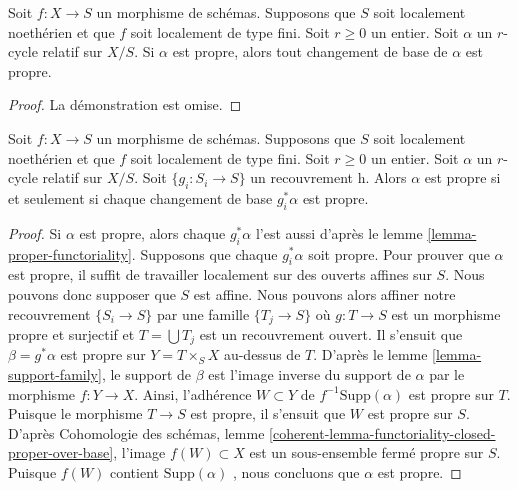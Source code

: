 \begin{lemma} 
\label{lemma-proper-functoriality} 
Soit  $f : X \to S$  un morphisme de schémas. Supposons que  $S$  soit localement noethérien et
 que  $f$  soit localement de type fini. Soit $r \geq 0$  un entier. Soit  
$\alpha$  un  $r$-cycle relatif sur $X/S$. Si  $\alpha$  est propre, 
alors tout changement de base de $\alpha$  est propre. 
\end{lemma} 

\begin{proof} La 
démonstration est omise. 
\end{proof} 

\begin{lemma} 
\label{lemma-proper-h-descent} 
Soit  $f : X \to S$  un morphisme de schémas. Supposons que  $S$  soit localement noethérien et
 que  $f$  soit localement de type fini. Soit $r \geq 0$  un entier. Soit  $\alpha$
  un  $r$-cycle relatif sur $X/S$. Soit  $\{g_i : S_i \to S\}$
  un recouvrement h. Alors  $\alpha$  est propre 
si et seulement si chaque changement de base  $g_i^*\alpha$  est propre. 
\end{lemma} 

\begin{proof} 
Si  $\alpha$  est propre, alors chaque  $g_i^*\alpha$  l'est aussi d'après
 le lemme \ref{lemma-proper-functoriality}. Supposons que chaque  $g_i^*\alpha$
  soit propre. Pour prouver que $\alpha$  est propre, il suffit de travailler 
localement sur des ouverts affines sur  $S$. Nous pouvons donc supposer que  $S$
  est affine. Nous pouvons alors affiner notre recouvrement  $\{S_i \to S\}$
  par une famille $\{T_j \to S\}$  où  $g : T \to S$  est un morphisme propre 
et surjectif et  $T = \bigcup T_j$ est un recouvrement ouvert.
 Il s'ensuit que  $\beta = g^*\alpha$  est propre sur $Y = T \times_S X$
  au-dessus de  $T$. D'après le lemme \ref{lemma-support-family}, le support de
  $\beta$  est l'image inverse du support de $\alpha$  par le 
morphisme  $f : Y \to X$. Ainsi, l'adhérence  $W \subset Y$
  de $f^{-1}\text{Supp}(\alpha)$  est propre sur  $T$. Puisque le 
morphisme  $T \to S$  est propre, il s'ensuit que  $W$  est propre sur  $S$.
 D'après Cohomologie des schémas, lemme 
\ref{coherent-lemma-functoriality-closed-proper-over-base},
 l'image  $f(W) \subset X$  est un sous-ensemble fermé propre sur  $S$. 
Puisque  $f(W)$  contient $\text{Supp}(\alpha)$ , nous concluons que  $\alpha$
  est propre. 
\end{proof} 



